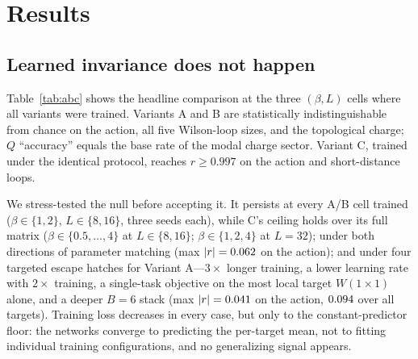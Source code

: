 \documentclass[aps,prd,twocolumn,superscriptaddress,nofootinbib]{revtex4-2}
\begin{document}
\section{Results}
\label{sec:results}

\subsection{Learned invariance does not happen}
\label{sec:null}

\begin{table}[t]
\caption{A/B/C comparison on gauge-invariant targets (test split, mean
$\pm$ std over seeds; 3 seeds for A/B, 5 for C). $Q$ acc.\ is
exact-integer accuracy after rounding. Variants A and B are at chance on
every target, up to the percent-level $\beta=1$ correlation discussed in
the text; the invariant oracle C is at ceiling except for the
receptive-field-limited $4\times4$ loop (Sec.~\ref{sec:oracle}).}
\label{tab:abc}
\centering

\end{table}

Table~\ref{tab:abc} shows the headline comparison at the three
$(\beta, L)$ cells where all variants were trained. Variants A and B are
statistically indistinguishable from chance on the action, all five
Wilson-loop sizes, and the topological charge; $Q$ ``accuracy'' equals
the base rate of the modal charge sector. Variant C, trained under the
identical protocol, reaches $r \ge 0.997$ on the action and short-distance
loops.

We stress-tested the null before accepting it. It persists at every
A/B cell trained ($\beta \in \{1,2\}$, $L \in \{8,16\}$, three seeds
each), while C's ceiling holds over its full matrix
($\beta \in \{0.5,\dots,4\}$ at $L \in \{8,16\}$; $\beta \in \{1,2,4\}$
at $L=32$); under both directions of parameter matching
(max $|r| = 0.062$ on the action); and under four
targeted escape hatches for Variant A---$3\times$ longer training, a
lower learning rate with $2\times$ training, a single-task objective on
the most local target $W(1{\times}1)$ alone, and a deeper $B=6$ stack
(max $|r| = 0.041$ on the action,
$0.094$ over all targets). Training loss decreases in
every case, but only to the constant-predictor floor: the networks
converge to predicting the per-target mean, not to fitting individual
training configurations, and no generalizing signal appears.
\end{document}
